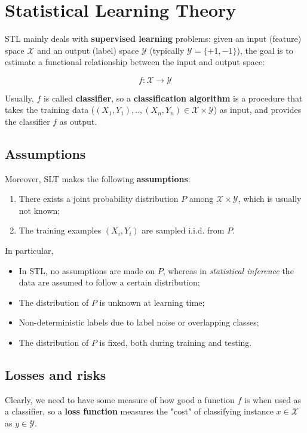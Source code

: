 \section{Statistical Learning Theory}
STL mainly deals with \textbf{supervised learning} problems: given an input (feature) space $\mathcal{X}$ and an output (label) space $\mathcal{Y}$ (typically $\mathcal{Y} = \{ +1, -1 \}$), the goal is to estimate a functional relationship between the input and output space:

$$
f: \mathcal{X} \xrightarrow{} \mathcal{Y}
$$

Usually, $f$ is called \textbf{classifier}, so a \textbf{classification algorithm} is a procedure that takes the training data ($(X_1, Y_1), .., (X_n, Y_n) \in \mathcal{X} \times \mathcal{Y}$) as input, and provides the classifier $f$ as output.

\subsection{Assumptions}
Moreover, SLT makes the following \textbf{assumptions}:

\begin{enumerate}
    \item There exists a joint probability distribution $P$ among $\mathcal{X} \times \mathcal{Y}$, which is usually not known;
    \item The training examples $(X_i, Y_i)$ are sampled i.i.d. from $P$.
\end{enumerate}

In particular, 

\begin{itemize}
    \item In STL, no assumptions are made on $P$, whereas in \textit{statistical inference} the data are assumed to follow a certain distribution;
    \item The distribution of $P$ is unknown at learning time;
    \item Non-deterministic labels due to label noise or overlapping classes;
    \item The distribution of $P$ is fixed, both during training and testing.
\end{itemize}

\subsection{Losses and risks}
Clearly, we need to have some measure of how good a function $f$ is when used as a classifier, so a \textbf{loss function} measures the "cost" of classifying instance $x \in \mathcal{X}$ as $y \in \mathcal{Y}$. 

